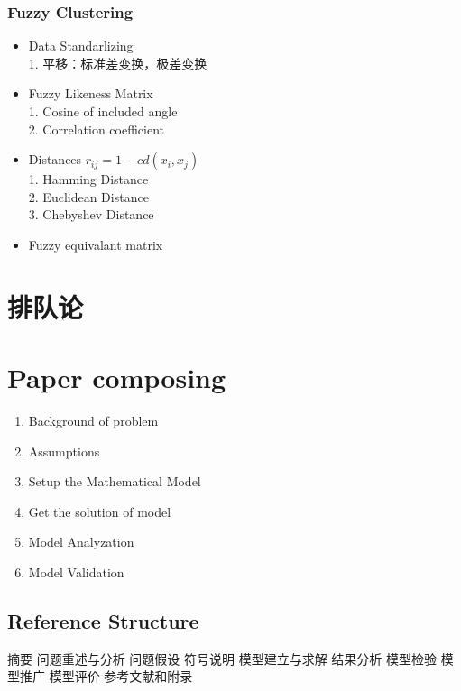 \documentclass[12pt,a4paper]{article} \usepackage{kurier}
\begin{document}
\begin{CJK}{UTF8}{gkai}
\begin{multicols}{2}
		\subsubsection{Fuzzy Clustering}
			\begin{itemize}
			\item Data Standarlizing\\
				1. 平移：标准差变换，极差变换
			\item Fuzzy Likeness Matrix\\
				1. Cosine of included angle\\
				2. Correlation coefficient\\
			\item Distances $r_{ij} = 1 - c d(x_i, x_j)$\\
				1. Hamming Distance\\
				2. Euclidean Distance\\
				3. Chebyshev Distance\\
			\item Fuzzy equivalant matrix
			\end{itemize}
\end{multicols}

\section{排队论}

\newpage
\appendix
\section{Paper composing}
\begin{multicols}{2}
	\begin{enumerate}
	\item Background of problem
	\item Assumptions
	\item Setup the Mathematical Model
	\item Get the solution of model
	\item Model Analyzation
	\item Model Validation
	\end{enumerate}
	\subsection{Reference Structure}
	摘要
	问题重述与分析
	问题假设
	符号说明
	模型建立与求解
	结果分析
	模型检验
	模型推广
	模型评价
	参考文献和附录
\end{multicols}


\end{CJK}
\end{document}
